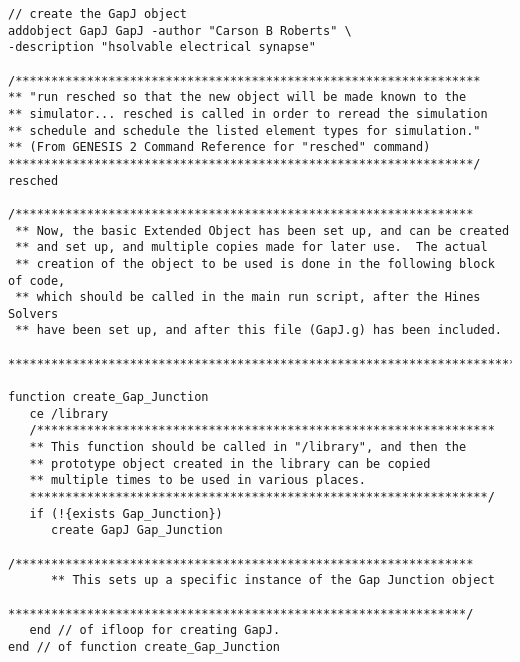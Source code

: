 \documentclass[12pt]{article}
\begin{document}
\begin{small}
\begin{verbatim}
// create the GapJ object
addobject GapJ GapJ -author "Carson B Roberts" \
-description "hsolvable electrical synapse"

/*****************************************************************
** "run resched so that the new object will be made known to the
** simulator... resched is called in order to reread the simulation
** schedule and schedule the listed element types for simulation."
** (From GENESIS 2 Command Reference for "resched" command)
*****************************************************************/
resched

/****************************************************************
 ** Now, the basic Extended Object has been set up, and can be created
 ** and set up, and multiple copies made for later use.  The actual
 ** creation of the object to be used is done in the following block of code,
 ** which should be called in the main run script, after the Hines Solvers
 ** have been set up, and after this file (GapJ.g) has been included.
 **************************************************************************/
 
function create_Gap_Junction
   ce /library
   /****************************************************************
   ** This function should be called in "/library", and then the
   ** prototype object created in the library can be copied
   ** multiple times to be used in various places.
   ****************************************************************/
   if (!{exists Gap_Junction})
      create GapJ Gap_Junction
      /****************************************************************
      ** This sets up a specific instance of the Gap Junction object
      ****************************************************************/
   end // of ifloop for creating GapJ.
end // of function create_Gap_Junction
\end{verbatim}
\end{small}
\end{document}
